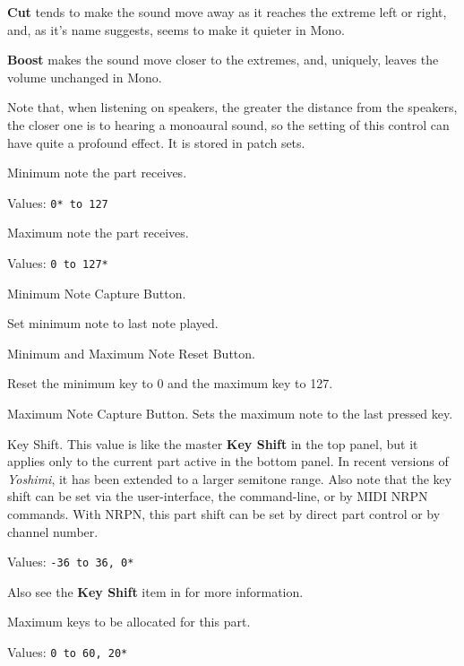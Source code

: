    \textbf{Cut} tends to make the sound move away as it reaches the extreme left
   or right, and, as it's name suggests, seems to make it quieter in Mono.

   \textbf{Boost} makes the sound move closer to the extremes, and, uniquely,
   leaves the volume unchanged in Mono.

   Note that, when listening on speakers, the greater the distance from the
   speakers, the closer one is to hearing a monoaural sound, so the setting of
   this control can have quite a profound effect. It is stored in patch sets.

   Minimum note the part receives.

   Values: \texttt{0* to 127}

   Maximum note the part receives.

   Values: \texttt{0 to 127*}

   Minimum Note Capture Button.

   Set minimum note to last note played.

   Minimum and Maximum Note Reset Button.

   Reset the minimum key to 0 and the maximum key to 127.

   Maximum Note Capture Button.
   Sets the maximum note to the last pressed key.

   Key Shift.
   This value is like the master \textbf{Key Shift} in the top panel, but
   it applies only to the current part active in the bottom panel.
   In recent versions of \textsl{Yoshimi}, it has been extended to a larger
   semitone range.
   Also note that the key shift can be set via the user-interface, the
   command-line, or by MIDI NRPN commands.
   With NRPN, this part shift
   can be set by direct part control or by channel number.

   Values: \texttt{-36 to 36, 0*}

   Also see the \textbf{Key Shift} item in
    for more information.

   Maximum keys to be allocated for this part.

   Values: \texttt{0 to 60, 20*}


